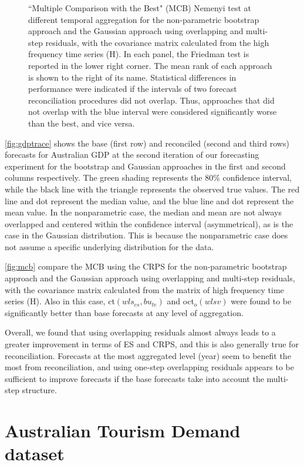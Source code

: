 \documentclass[a4paper,11pt]{article}
\theoremstyle{definition}
\begin{document}
\begin{figure}[p]
	\caption{“Multiple Comparison with the Best" (MCB) Nemenyi test at different temporal aggregation for the non-parametric bootstrap approach and the Gaussian approach using overlapping and multi-step residuals, with the covariance matrix calculated from the high frequency time series (H). In each panel, the Friedman test is reported in the lower right corner. The mean rank of each approach is shown to the right of its name. Statistical differences in performance were indicated if the intervals of two forecast reconciliation procedures did not overlap. Thus, approaches that did not overlap with the blue interval were considered significantly worse than the best, and vice versa.}
	\label{fig:mcb}
\end{figure}

\autoref{fig:gdptrace} shows the base (first row) and reconciled (second and third rows) forecasts for Australian GDP at the second iteration of our forecasting experiment for the bootstrap and Gaussian approaches in the first and second columns respectively. The green shading represents the 80\% confidence interval, while the black line with the triangle represents the observed true values. The red line and dot represent the median value, and the blue line and dot represent the mean value. In the nonparametric case, the median and mean are not always overlapped and centered within the confidence interval (asymmetrical), as is the case in the Gaussian distribution. This is because the nonparametric case does not assume a specific underlying distribution for the data.

\autoref{fig:mcb} compare the MCB using the CRPS for the non-parametric bootstrap approach and the Gaussian approach using overlapping and multi-step residuals, with the covariance matrix calculated from the matrix of high frequency time series (H). Also in this case, ct$(wls_{cs},bu_{te})$ and oct$_o(wlsv)$ were found to be significantly better than base forecasts at any level of aggregation.

Overall, we found that using overlapping residuals almost always leads to a greater improvement in terms of ES and CRPS, and this is also generally true for reconciliation. Forecasts at the most aggregated level (year) seem to benefit the most from reconciliation, and using one-step overlapping residuals appears to be sufficient to improve forecasts if the base forecasts take into account the multi-step structure.

\section{Australian Tourism Demand dataset}\label{sec:vn525}
\end{document}
